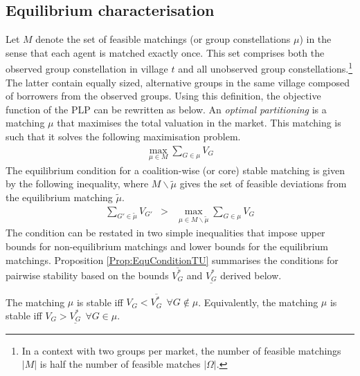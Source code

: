 \subsection{Equilibrium characterisation}

Let $M$ denote the set of feasible matchings (or group constellations $\mu$) in the sense that each agent is matched exactly once. This set comprises both the observed group constellation in village $t$ and all unobserved group constellations.\footnote{In a context with two groups per market, the number of feasible matchings $|M|$ is half the number of feasible matches $|\Omega|$.} The latter contain equally sized, alternative groups in the same village composed of borrowers from the observed groups. %
Using this definition, the objective function of the PLP can be rewritten as below. An \textit{optimal partitioning} is a matching $\mu$ that maximises the total valuation in the market. This matching is such that it solves the following maximisation problem.
\begin{eqnarray}
\max_{\mu \in M} \sum_{G \in \mu} V_G
\end{eqnarray}
The equilibrium condition for a coalition-wise (or core) stable matching is given by the following inequality, where $M\backslash \tilde \mu$ gives the set of feasible deviations from the equilibrium matching $\tilde \mu$.
\begin{eqnarray}
\sum_{G' \in \tilde \mu} V_{G'} &>& \max_{\mu \in M\backslash \tilde \mu} \sum_{G \in \mu} V_G
\end{eqnarray}
The condition can be restated in two simple inequalities that impose upper bounds for non-equilibrium matchings and lower bounds for the equilibrium matchings. Proposition \ref{Prop:EquConditionTU} summarises the conditions for pairwise stability based on the bounds $\overline{V_G^*}$ and $\underline{V_G^*}$ derived below. 

\begin{myprop} \label{Prop:EquConditionTU}
The matching $\mu$ is stable iff $V_G < \overline{V_G^*} \ \ \forall G \notin \mu$. Equivalently, the matching $\mu$ is stable iff $V_G > \underline{V_G^*} \ \ \forall G \in \mu$.
\end{myprop}

